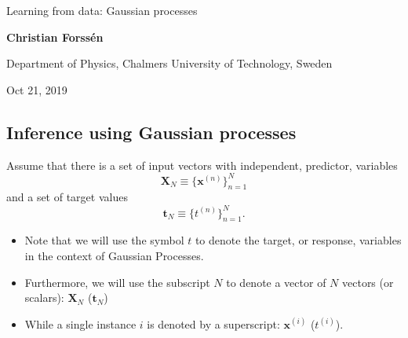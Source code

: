 \documentclass[%
oneside,                 %
final,                   %
10pt]{article}
\begin{document}

\newcommand{\exercisesection}[1]{\subsection*{#1}}







\thispagestyle{empty}

\begin{center}
{\LARGE\bf
\begin{spacing}{1.25}
Learning from data: Gaussian processes
\end{spacing}
}
\end{center}


\begin{center}
{\bf Christian Forssén}
\end{center}

    \begin{center}
\centerline{{\small Department of Physics, Chalmers University of Technology, Sweden}}
\end{center}
    

\begin{center}
Oct 21, 2019
\end{center}

\vspace{1cm}


\subsection{Inference using Gaussian processes}

Assume that there is a set of input vectors with independent, predictor, variables
\[ \boldsymbol{X}_N \equiv \{ \boldsymbol{x}^{(n)}\}_{n=1}^N \]
and a set of target values
\[ \boldsymbol{t}_N \equiv \{ t^{(n)}\}_{n=1}^N. \]

\begin{itemize}
\item Note that we will use the symbol $t$ to denote the target, or response, variables in the context of Gaussian Processes. 

\item Furthermore, we will use the subscript $N$ to denote a vector of $N$ vectors (or scalars): $\boldsymbol{X}_N$ ($\boldsymbol{t}_N$)

\item While a single instance $i$ is denoted by a superscript: $\boldsymbol{x}^{(i)}$ ($t^{(i)}$).
\end{itemize}
\end{document}
